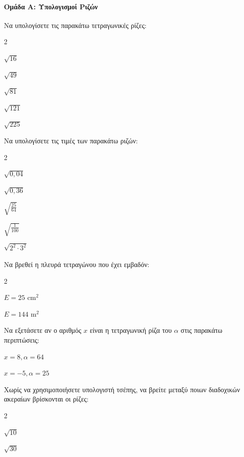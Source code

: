 \documentclass[11pt,a4paper,modern]{FFExercises}
\begin{document}

\paragraph{Ομάδα Α: Υπολογισμοί Ριζών}

\askhsh Να υπολογίσετε τις παρακάτω τετραγωνικές ρίζες:
\begin{multicols}{2}
\begin{alist}
    \item $\sqrt{16}$
    \item $\sqrt{49}$
    \item $\sqrt{81}$
    \item $\sqrt{121}$
    \item $\sqrt{225}$
\end{alist}
\end{multicols}

\askhsh Να υπολογίσετε τις τιμές των παρακάτω ριζών:
\begin{multicols}{2}
\begin{alist}
    \item $\sqrt{0,04}$
    \item $\sqrt{0,36}$
    \item $\sqrt{\frac{25}{64}}$
    \item $\sqrt{\frac{1}{100}}$
    \item $\sqrt{2^2 \cdot 3^2}$
\end{alist}
\end{multicols}

\askhsh Να βρεθεί η πλευρά τετραγώνου που έχει εμβαδόν:
\begin{multicols}{2}
\begin{alist}
    \item $E = 25 \text{ cm}^2$
    \item $E = 144 \text{ m}^2$
\end{alist}
\end{multicols}

\askhsh Να εξετάσετε αν ο αριθμός $x$ είναι η τετραγωνική ρίζα του $\alpha$ στις παρακάτω περιπτώσεις:
\begin{alist}
    \item $x = 8, \alpha = 64$
    \item $x = -5, \alpha = 25$
\end{alist}

\askhsh Χωρίς να χρησιμοποιήσετε υπολογιστή τσέπης, να βρείτε μεταξύ ποιων διαδοχικών ακεραίων βρίσκονται οι ρίζες:
\begin{multicols}{2}
\begin{alist}
    \item $\sqrt{10}$
    \item $\sqrt{30}$
\end{alist}
\end{multicols}
\end{document}
